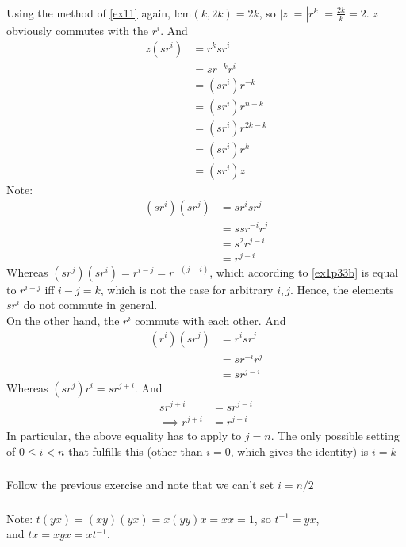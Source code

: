 \documentclass{article}
\newcommand{\inv}[1]{ {#1}^{-1} }
\begin{document}
\subsubsection{}\label{ex2p4}
Using the method of \ref{ex11} again, $\mbox{lcm}(k,2k) = 2k$, so $|z|=|r^k|=\frac{2k}{k} = 2$. $z$ obviously commutes with the $r^i$. And
\begin{align*}
z(sr^i) &= r^ksr^i\\
&= sr^{-k}r^i\\
&= (sr^i)r^{-k}\\
&= (sr^i)r^{n-k}\\
&= (sr^i)r^{2k-k}\\
&= (sr^i)r^k\\
&= (sr^i)z
\end{align*}
Note:
\begin{align*}
(sr^i)(sr^j) &= sr^isr^j\\
&= ssr^{-i}r^{j}\\
&= s^2r^{j-i}\\
&= r^{j-i}
\end{align*}
Whereas $(sr^j)(sr^i) = r^{i-j} =r^{-(j-i)}$, which according to \ref{ex1p33b} is equal to $r^{i-j}$ iff $i-j =k$, which is not the case for arbitrary $i,j$. Hence, the elements $sr^i$ do not commute in general.\\
On the other hand, the $r^i$ commute with each other. And 
\begin{align*}
(r^i)(sr^j) &= r^isr^j\\
&= sr^{-i}r^j\\
&= sr^{j-i}
\end{align*}
Whereas $(sr^j)r^i = sr^{j+i}$. And 
\begin{align*}
sr^{j+i} &= sr^{j-i}\\
\implies r^{j+i} &= r^{j-i}
\end{align*}
In particular, the above equality has to apply to $j=n$. The only possible setting of $0 \leq i < n$ that fulfills this (other than $i=0$, which gives the identity) is $i=k$
\subsubsection{}\label{ex2p5}
Follow the previous exercise and note that we can't set $i=n/2$
\subsubsection{}\label{ex2p6}
Note: $t(yx) = (xy)(yx) = x(yy)x = xx = 1$, so $\inv{t} = yx$,\\
and $tx = xyx = x\inv{t}$.
\end{document}
